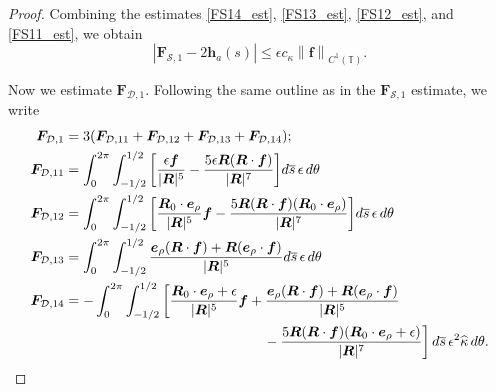 \documentclass[11pt]{article}
\numberwithin{equation}{section}
\newcommand{\T}{\mathbb{T}}
\newcommand{\bars}{\overline s}
\newcommand{\be}{\bm{e}}
\newcommand{\ts}{\thinspace}
\newcommand{\abs}[1]{\left\lvert #1 \right\rvert}
\newcommand{\norm}[1]{\left\lVert #1 \right\rVert}
\newcommand{\wh}[1]{\widehat{#1}}
\newcommand{\mc}[1]{\mathcal{#1}}
\theoremstyle{definition}
\begin{document}
\begin{proof}
%
%
Combining the estimates \eqref{FS14_est}, \eqref{FS13_est}, \eqref{FS12_est}, and \eqref{FS11_est}, we obtain
\begin{equation}\label{FS1_est}
\abs{\bm{F}_{\mc{S},1}- 2\bm{h}_a(s)} \le \epsilon c_\kappa \norm{\bm{f}}_{C^1(\T)}.
\end{equation}

Now we estimate $\bm{F}_{\mc{D},1}$. Following the same outline as in the $\bm{F}_{\mc{S},1}$ estimate, we write 
\begin{equation}\label{FD1}
\begin{aligned}
 \bm{F}_{\mc{D},1} &= 3(\bm{F}_{\mc{D},11} + \bm{F}_{\mc{D},12} + \bm{F}_{\mc{D},13}+ \bm{F}_{\mc{D},14}); \\
\bm{F}_{\mc{D},11}&= \int_0^{2\pi}\int_{-1/2}^{1/2} \bigg[\frac{\epsilon{\bm f}}{|\bm{R}|^5} -\frac{5\epsilon\bm{R}(\bm{R}\cdot\bm{f})}{|\bm{R}|^7} \bigg] d\bars \ts \epsilon \ts d\theta\\
\bm{F}_{\mc{D},12}&= \int_0^{2\pi}\int_{-1/2}^{1/2} \bigg[\frac{\bm{R}_0\cdot\be_{\rho}}{|\bm{R}|^5}{\bm f} -\frac{5\bm{R}(\bm{R}\cdot\bm{f})(\bm{R}_0\cdot\be_{\rho})}{|\bm{R}|^7} \bigg] d\bars \ts \epsilon \ts d\theta\\
\bm{F}_{\mc{D},13}&= \int_0^{2\pi}\int_{-1/2}^{1/2} \frac{\be_{\rho}(\bm{R}\cdot\bm{f})+\bm{R}(\be_{\rho}\cdot\bm{f}) }{|\bm{R}|^5}  d\bars \ts \epsilon \ts d\theta\\
\bm{F}_{\mc{D},14}&= -\int_0^{2\pi}\int_{-1/2}^{1/2} \bigg[\frac{\bm{R}_0\cdot\be_{\rho}+\epsilon}{|\bm{R}|^5}{\bm f} + \frac{\be_{\rho}(\bm{R}\cdot\bm{f})+\bm{R}(\be_{\rho}\cdot\bm{f})}{|\bm{R}|^5} \\
&\hspace{5cm} -\frac{5\bm{R}(\bm{R}\cdot\bm{f})(\bm{R}_0\cdot\be_{\rho}+\epsilon)}{|\bm{R}|^7}\bigg] \ts d\bars \ts \epsilon^2\wh\kappa \ts d\theta.
\end{aligned}
\end{equation}


\end{proof}
\end{document}
